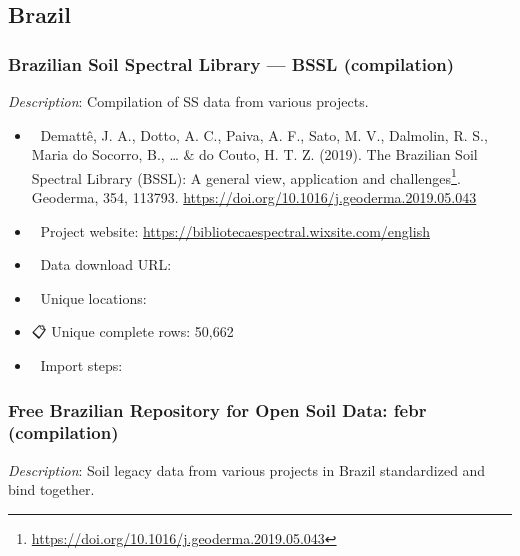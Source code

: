 \documentclass[
  graybox,natbib,nospthms]{svmono}
\providecommand{\tightlist}{%
  \setlength{\itemsep}{0pt}\setlength{\parskip}{0pt}}
\providecommand{\tightlist}{\setlength{\itemsep}{0pt}\setlength{\parskip}{0pt}}
\renewcommand{\href}[2]{#2 (\url{#1})}
\renewcommand{\href}[2]{#2\footnote{\url{#1}}}
\begin{document}
\hypertarget{brazil}{%
\subsection{Brazil}\label{brazil}}

\hypertarget{brazilian-soil-spectral-library-bssl-compilation}{%
\subsubsection{Brazilian Soil Spectral Library --- BSSL (compilation)}\label{brazilian-soil-spectral-library-bssl-compilation}}

\emph{Description}: Compilation of SS data from various projects.

\begin{itemize}
\tightlist
\item
  📕 Demattê, J. A., Dotto, A. C., Paiva, A. F., Sato, M. V., Dalmolin, R. S., Maria do Socorro, B., \ldots{} \& do Couto, H. T. Z. (2019). \href{https://doi.org/10.1016/j.geoderma.2019.05.043}{The Brazilian Soil Spectral Library (BSSL): A general view, application and challenges}. Geoderma, 354, 113793. \url{https://doi.org/10.1016/j.geoderma.2019.05.043}\\
\item
  🔗 Project website: \url{https://bibliotecaespectral.wixsite.com/english}\\
\item
  📂 Data download URL:\\
\item
  📍 Unique locations:\\
\item
  📋 Unique complete rows: 50,662\\
\item
  📝 Import steps:
\end{itemize}

\hypertarget{free-brazilian-repository-for-open-soil-data-febr-compilation}{%
\subsubsection{Free Brazilian Repository for Open Soil Data: febr (compilation)}\label{free-brazilian-repository-for-open-soil-data-febr-compilation}}

\emph{Description}: Soil legacy data from various projects in Brazil standardized and bind together.
\end{document}
